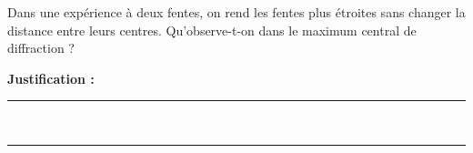 Dans une expérience à deux fentes, on rend les fentes plus étroites sans changer la distance entre leurs centres. Qu'observe-t-on dans le maximum central de diffraction ?

\choices

\noindent\textbf{Justification :} \hrulefill \\[2.5ex]
\rule{\linewidth}{0.4pt} \\[2.5ex]
\rule{\linewidth}{0.4pt}
\vfill
